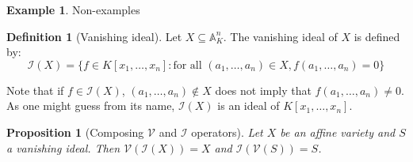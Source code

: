 \documentclass[12pt, a4paper]{article}
\newtheorem{proposition}[theorem]{Proposition}
\theoremstyle{definition}
\newtheorem{definition}{Definition}
\newtheorem{example}{Example}
\begin{document}
\newpage
\begin{example}
  Non-examples
  \begin{center}
\end{center}
\end{example}

\begin{definition}[Vanishing ideal]
	Let $X \subseteq \mathbb{A}^n_K$. The vanishing ideal of $X$ is defined by:
	$$\mathcal{I}(X) = \{f \in K[x_1, \dots, x_n] : \text{for all } (a_1, \dots, a_n) \in X, f(a_1, \dots, a_n) = 0\}$$
      \end{definition}

      
Note that if $f \in \mathcal{I}(X)$, $(a_1, \dots, a_n) \notin X$ does not imply that $f(a_1, \dots, a_n) \neq 0$. As one might guess from its name, $\mathcal{I}(X)$ is an ideal of $K[x_1, \dots, x_n]$.


\begin{proposition}[Composing $\mathcal{V}$ and $\mathcal{I}$ operators]
	Let $X$ be an affine variety and $S$ a vanishing ideal. Then $\mathcal{V}(\mathcal{I}(X)) = X$ and $\mathcal{I}(\mathcal{V}(S)) = S$.
\end{proposition}
\end{document}
